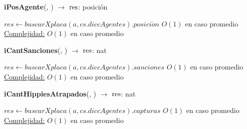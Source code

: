 \begin{Algoritmos}
\begin{algorithm}[H]{\textbf{iPosAgente}(, ) $\to$ $\res$: posici\'on}
	\begin{algorithmic}
       	\State $res \gets buscarXplaca(a,cs.diccAgentes).posici\acute{o}n$ \Comment $O(1)$ en caso promedio
        \medskip
		\Statex \underline{Complejidad:} $O(1)$ en caso promedio
	\end{algorithmic}
\end{algorithm}

\begin{algorithm}[H]{\textbf{iCantSanciones}(, ) $\to$ $\res$: nat}
	\begin{algorithmic}
        	\State $res \gets buscarXplaca(a,cs.diccAgentes).sanciones$	\Comment $O(1)$ en caso promedio
    	\medskip
		\Statex \underline{Complejidad:} $O(1)$ en caso promedio
	\end{algorithmic}
\end{algorithm}

\begin{algorithm}[H]{\textbf{iCantHippiesAtrapados}(, ) $\to$ $\res$: nat}
	\begin{algorithmic}
       	\State $res \gets buscarXplaca(a,cs.diccAgentes).capturas$ \Comment $O(1)$ en caso promedio
        \medskip
		\Statex \underline{Complejidad:} $O(1)$ en caso promedio
	\end{algorithmic}
\end{algorithm}


\end{Algoritmos}
